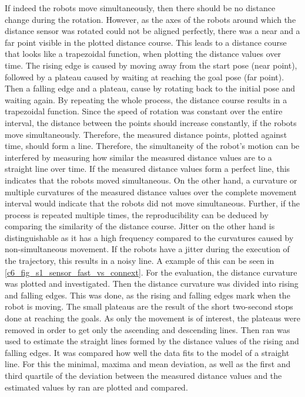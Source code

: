 If indeed the robots move simultaneously, then there should be no distance change during the rotation. However, as the axes of the robots around which the distance sensor was rotated could not be aligned perfectly, there was a near and a far point visible in the plotted distance course. This leads to a distance course that looks like a trapezoidal function, when plotting the distance values over time. The rising edge is caused by moving away from the start pose (near point), followed by a plateau caused by waiting at reaching the goal pose (far point). Then a falling edge and a plateau, cause by rotating back to the initial pose and waiting again. By repeating the whole process, the distance course results in a trapezoidal function. Since the speed of rotation was constant over the entire interval, the distance between the points should increase constantly, if the robots move simultaneously. Therefore, the measured distance points, plotted against time, should form a line. Therefore, the simultaneity of the robot's motion can be interfered by measuring how similar the measured distance values are to a straight line over time. If the measured distance values form a perfect line, this indicates that the robots moved simultaneous. On the other hand, a curvature or multiple curvatures of the measured distance values over the complete movement interval would indicate that the robots did not move simultaneous. Further, if the process is repeated multiple times, the reproducibility can be deduced by comparing the similarity of the distance course. Jitter on the other hand is distinguishable as it has a high frequency compared to the curvatures caused by non-simultaneous movement. If the robots have a jitter during the execution of the trajectory, this results in a noisy line. A example of this can be seen in \autoref{c6_fig_s1_sensor_fast_vs_connext}.\newline
For the evaluation, the distance curvature was plotted and investigated. Then the distance curvature was divided into rising and falling edges. This was done, as the rising and falling edges mark when the robot is moving. The small plateaus are the result of the short two-second stops done at reaching the goals. As only the movement is of interest, the plateaus were removed in order to get only the ascending and descending lines. Then \gls{ran} was used to estimate the straight lines formed by the distance values of the rising and falling edges. It was compared how well the data fits to the model of a straight line. For this the minimal, maxima and mean deviation, as well as the first and third quartile of the deviation between the measured distance values and the estimated values by \gls{ran} are plotted and compared. 
